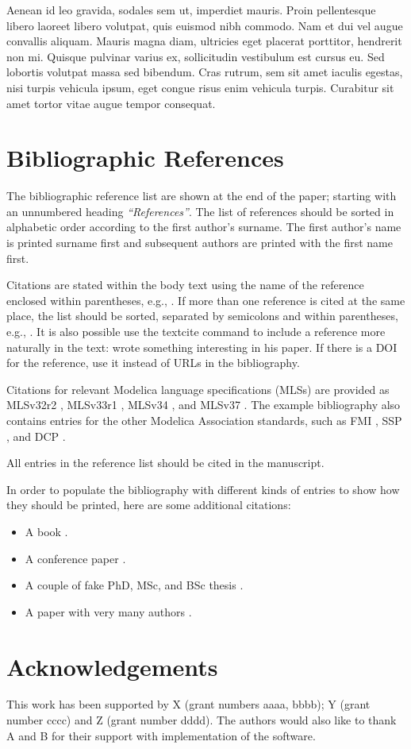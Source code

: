 \documentclass{modelica}
\begin{document}
Aenean id leo gravida, sodales sem ut, imperdiet mauris. Proin pellentesque libero laoreet libero volutpat, quis euismod nibh commodo. Nam et dui vel augue convallis aliquam. Mauris magna diam, ultricies eget placerat porttitor, hendrerit non mi. Quisque pulvinar varius ex, sollicitudin vestibulum est cursus eu. Sed lobortis volutpat massa sed bibendum. Cras rutrum, sem sit amet iaculis egestas, nisi turpis vehicula ipsum, eget congue risus enim vehicula turpis. Curabitur sit amet tortor vitae augue tempor consequat.

\section{Bibliographic References}
The bibliographic reference list are shown at the end of the paper;
starting with an unnumbered heading \emph{``References''}. The list of
references should be sorted in alphabetic order according to the first
author's surname.
The first author's name is printed surname first and subsequent authors are printed with the first name first.

Citations are stated within the body text using the name of the
reference enclosed within parentheses, e.g., \cite{Pantelides:1988}. If
more than one reference is cited at the same place, the list should be
sorted, separated by semicolons and within parentheses, e.g.,
\cite{DuffReid:1978,Pierce:2002,Plotkin:1981}.
It is also possible use the textcite command to include a reference more naturally in the text: \textcite{Pantelides:1988} wrote something interesting in his paper.
If there is a DOI for the reference, use it instead of URLs in the bibliography.

Citations for relevant Modelica language specifications (MLSs) are provided as
MLSv32r2 \cite{MLSv32r2}, MLSv33r1 \cite{MLSv33r1}, MLSv34 \cite{MLSv34}, and MLSv37 \cite{MLSv37}.
The example bibliography also contains entries for the other Modelica Association standards,
such as FMI \cite{FMIv2:0:5,FMIv3:0:2}, SSP \cite{SSPv2:0:1}, and DCP \cite{DCPv1:0}.

All entries in the reference list should be cited in the manuscript.

In order to populate the bibliography with different kinds of entries to show how they should be printed, here are some additional citations:

\begin{itemize}
\item A book \cite{Kernighan:1988}.
\item A conference paper \cite{colaco:2003}.
\item A couple of fake PhD, MSc, and BSc thesis \cite{Doe:PhD,Doe:MSc,Doe:BSc}.
\item A paper with very many authors \cite{paperwithmanyauthors}.
\end{itemize}

\section*{Acknowledgements}

This work has been supported by X (grant numbers aaaa, bbbb); Y (grant number cccc) and Z (grant number dddd).
The authors would also like to thank A and B for their support with implementation of the software.

\printbibliography
\end{document}
